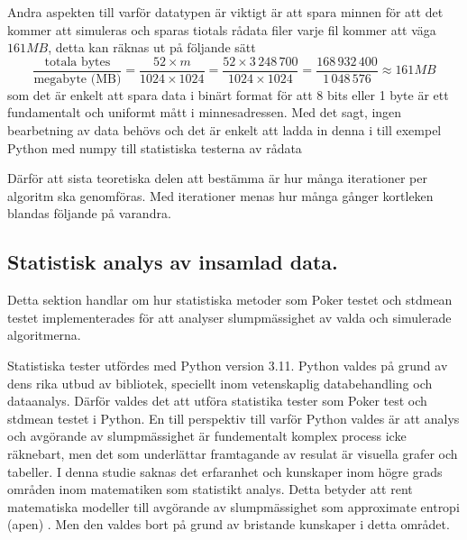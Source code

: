\documentclass[swedish,a4paper]{article}
\begin{document}
Andra aspekten till varför datatypen är viktigt är att spara minnen för att det
kommer att simuleras och sparas tiotals rådata filer varje fil kommer att väga
$161 MB$,
detta kan räknas ut på följande sätt
$$ \frac{\text{totala bytes}}{\text{megabyte (MB)}} = \frac{52 \times m }{1024 \times
1024} = \frac{52 \times 3\,248\,700}{1024 \times 1024} = \frac{168\,932\,400}{1\,048\,576} \approx 161 MB 
$$
som det är enkelt att spara data i binärt format för att 8 bits eller 1 byte
är ett fundamentalt och uniformt mått i minnesadressen. Med det sagt, ingen
bearbetning av data behövs och det är enkelt att ladda in denna i till exempel Python
med numpy till statistiska testerna av rådata

Därför att sista teoretiska delen att bestämma
är hur många iterationer per algoritm ska genomföras. Med iterationer menas
hur många gånger kortleken blandas följande på varandra.


\subsection{Statistisk analys av insamlad data.}
Detta sektion handlar om hur statistiska metoder som Poker testet och 
\gls{stdmean} testet implementerades för att analyser slumpmässighet av valda
och simulerade algoritmerna.

Statistiska tester utfördes med Python version 3.11. Python valdes på
grund av dens rika utbud av bibliotek, speciellt inom
veten\-skaplig data\-behandling och data\-analys. Därför valdes det
att utföra statistika tester som Poker test och \gls{stdmean} testet i Python.
En till perspektiv till varför Python valdes är att analys och avgörande
av slump\-mässighet är fundementalt komplex process icke räknebart, men det som
underlättar framtagande av resulat är visuella grafer och tabeller. I
denna studie saknas det erfaranhet och kunskaper inom högre grads
områden inom matematiken som statistikt analys. Detta betyder att rent
matematiska modeller till avgörande av slumpmässighet som approximate
entropi (\gls{apen})  \parencite{ApEn}. Men den valdes bort på grund 
av bristande kunskaper i detta området.


\end{document}
